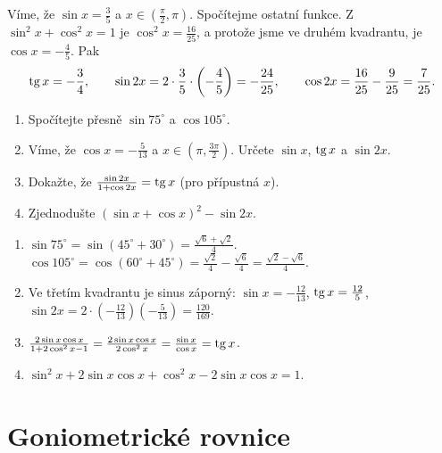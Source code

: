 \begin{example}
  Víme, že $\sin x = \frac{3}{5}$ a $x\in\left(\frac{\pi}{2}, \pi\right)$. Spočítejme ostatní funkce. Z $\sin^2 x + \cos^2 x = 1$ je $\cos^2 x = \frac{16}{25}$, a protože jsme ve druhém kvadrantu, je $\cos x = -\frac{4}{5}$. Pak
  \begin{equation*}
    \operatorname{tg} x = -\frac{3}{4},\qquad\sin 2x = 2\cdot\frac{3}{5}\cdot\left(-\frac{4}{5}\right) = -\frac{24}{25},\qquad\cos 2x = \frac{16}{25} - \frac{9}{25} = \frac{7}{25}.
  \end{equation*}
\end{example}

\begin{problem}
  \begin{enumerate}[label=(\alph*)]
    \item Spočítejte přesně $\sin 75^\circ$ a $\cos 105^\circ$.
    \item Víme, že $\cos x = -\frac{5}{13}$ a $x\in\left(\pi, \frac{3\pi}{2}\right)$. Určete $\sin x$, $\operatorname{tg} x$ a $\sin 2x$.
    \item Dokažte, že $\frac{\sin 2x}{1 + \cos 2x} = \operatorname{tg} x$ (pro přípustná $x$).
    \item Zjednodušte ${(\sin x + \cos x)}^2 - \sin 2x$.
  \end{enumerate}
\end{problem}

\begin{solution}
  \begin{enumerate}[label=(\alph*)]
    \item $\sin 75^\circ = \sin(45^\circ + 30^\circ) = \frac{\sqrt{6} + \sqrt{2}}{4}$. $\cos 105^\circ = \cos(60^\circ + 45^\circ) = \frac{\sqrt{2}}{4} - \frac{\sqrt{6}}{4} = \frac{\sqrt{2} - \sqrt{6}}{4}$.
    \item Ve třetím kvadrantu je sinus záporný: $\sin x = -\frac{12}{13}$, $\operatorname{tg} x = \frac{12}{5}$, $\sin 2x = 2\cdot\left(-\frac{12}{13}\right)\left(-\frac{5}{13}\right) = \frac{120}{169}$.
    \item $\frac{2\sin x\cos x}{1 + 2\cos^2 x - 1} = \frac{2\sin x\cos x}{2\cos^2 x} = \frac{\sin x}{\cos x} = \operatorname{tg} x$.
    \item $\sin^2 x + 2\sin x\cos x + \cos^2 x - 2\sin x\cos x = 1$.
  \end{enumerate}
\end{solution}

\section{Goniometrické rovnice}\label{sec:gon-rovnice}

